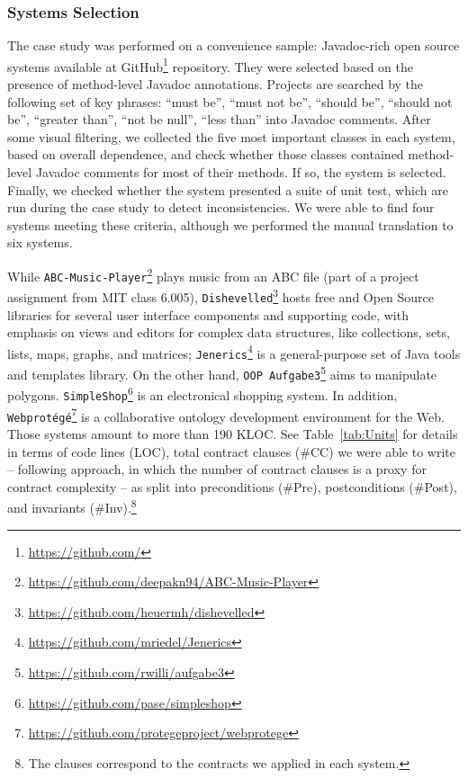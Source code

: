 \subsubsection{Systems Selection} 
\label{sec:systems}

The case study was performed on a convenience sample: \totalSystems{} Javadoc-rich open source systems available at GitHub\footnote{\url{https://github.com/}} repository.
They were selected based on the presence of method-level Javadoc annotations. 
Projects are searched by the following set of key phrases: ``must be'', ``must not be'', ``should
be'', ``should not be'', ``greater than'', ``not be null'', ``less than'' into Javadoc
comments.
After some visual filtering, we collected the five most important classes in
each system, based on overall dependence, and check whether those classes
contained method-level Javadoc comments for most of their methods. If so, the
system is selected. Finally, we checked whether the system presented a suite of
unit test, which are run during the case study to detect inconsistencies. We
were able to find four systems meeting these criteria, although we performed the
manual translation to six systems.

While \texttt{ABC-Music-Player}\footnote{\url{https://github.com/deepakn94/ABC-Music-Player}}
plays music from an ABC file (part of a project assignment from MIT class
6.005), \texttt{Dishevelled}\footnote{\url{https://github.com/heuermh/dishevelled}} hosts
free and Open Source libraries for several user interface components and
supporting code, with emphasis on views and editors for complex data structures, like collections, sets, lists, maps, graphs, and
matrices; \texttt{Jenerics}\footnote{\url{https://github.com/mriedel/Jenerics}} is a general-purpose set of Java tools and templates library.
On the other hand, \texttt{OOP
Aufgabe3}\footnote{\url{https://github.com/rwilli/aufgabe3}} aims to manipulate
polygons. \texttt{SimpleShop}\footnote{\url{https://github.com/pase/simpleshop}} is an
electronical shopping system. In addition,
\texttt{Webprot\'{e}g\'{e}}\footnote{\url{https://github.com/protegeproject/webprotege}}
is a collaborative ontology development environment for the Web. Those systems amount to more than 190 KLOC. See Table~\ref{tab:Units} for details in
terms of code lines (LOC), total contract clauses (\#CC) we were able to write
-- following \cite{Estler-etal14} approach, in which the number of contract clauses is a proxy for contract complexity -- as split
into preconditions (\#Pre), postconditions (\#Post), and invariants (\#Inv).\footnote{The clauses
correspond to the contracts we applied in each system.}

